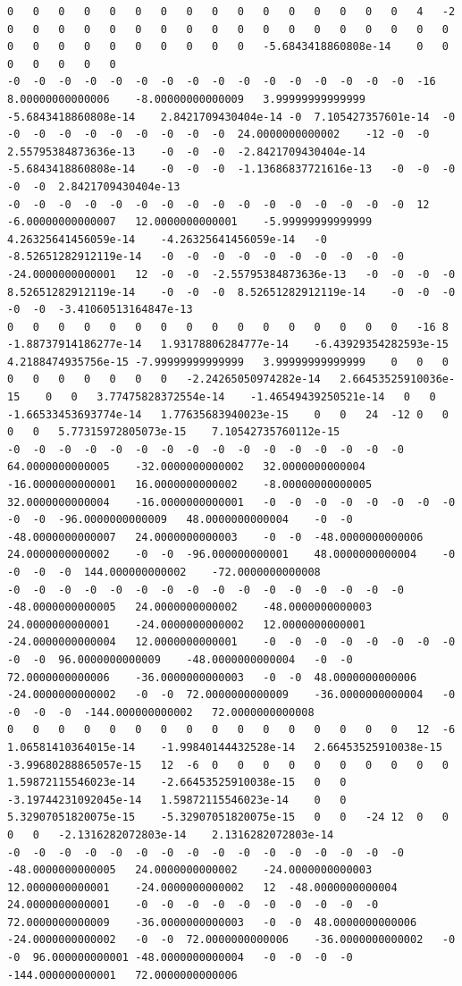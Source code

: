 \documentclass[12pt]{report} %
\begin{document}
\begin{landscape}
\begin{lstlisting}[numbers=none, basicstyle=\ttfamily\tiny, captionpos=b, caption={Matriz de coeficientes $W = G^{-1}$ ($54\times54$) calculada con MATLAB, sin redondear.}, label=cod:W-matlab]
0	0	0	0	0	0	0	0	0	0	0	0	0	0	0	0	4	-2	0	0	0	0	0	0	0	0	0	0	0	0	0	0	0	0	0	0	0	0	0	0	0	0	0	0	0	0	-5.6843418860808e-14	0	0	0	0	0	0	0
-0	-0	-0	-0	-0	-0	-0	-0	-0	-0	-0	-0	-0	-0	-0	-0	-16	8.00000000000006	-8.00000000000009	3.99999999999999	-5.6843418860808e-14	2.8421709430404e-14	-0	7.105427357601e-14	-0	-0	-0	-0	-0	-0	-0	-0	-0	-0	24.0000000000002	-12	-0	-0	2.55795384873636e-13	-0	-0	-0	-2.8421709430404e-14	-5.6843418860808e-14	-0	-0	-0	-1.13686837721616e-13	-0	-0	-0	-0	-0	2.8421709430404e-13
-0	-0	-0	-0	-0	-0	-0	-0	-0	-0	-0	-0	-0	-0	-0	-0	12	-6.00000000000007	12.0000000000001	-5.99999999999999	4.26325641456059e-14	-4.26325641456059e-14	-0	-8.52651282912119e-14	-0	-0	-0	-0	-0	-0	-0	-0	-0	-0	-24.0000000000001	12	-0	-0	-2.55795384873636e-13	-0	-0	-0	-0	8.52651282912119e-14	-0	-0	-0	8.52651282912119e-14	-0	-0	-0	-0	-0	-3.41060513164847e-13
0	0	0	0	0	0	0	0	0	0	0	0	0	0	0	0	-16	8	-1.88737914186277e-14	1.93178806284777e-14	-6.43929354282593e-15	4.2188474935756e-15	-7.99999999999999	3.99999999999999	0	0	0	0	0	0	0	0	0	0	-2.24265050974282e-14	2.66453525910036e-15	0	0	3.77475828372554e-14	-1.46549439250521e-14	0	0	-1.66533453693774e-14	1.77635683940023e-15	0	0	24	-12	0	0	0	0	5.77315972805073e-15	7.10542735760112e-15
-0	-0	-0	-0	-0	-0	-0	-0	-0	-0	-0	-0	-0	-0	-0	-0	64.0000000000005	-32.0000000000002	32.0000000000004	-16.0000000000001	16.0000000000002	-8.00000000000005	32.0000000000004	-16.0000000000001	-0	-0	-0	-0	-0	-0	-0	-0	-0	-0	-96.0000000000009	48.0000000000004	-0	-0	-48.0000000000007	24.0000000000003	-0	-0	-48.0000000000006	24.0000000000002	-0	-0	-96.000000000001	48.0000000000004	-0	-0	-0	-0	144.000000000002	-72.0000000000008
-0	-0	-0	-0	-0	-0	-0	-0	-0	-0	-0	-0	-0	-0	-0	-0	-48.0000000000005	24.0000000000002	-48.0000000000003	24.0000000000001	-24.0000000000002	12.0000000000001	-24.0000000000004	12.0000000000001	-0	-0	-0	-0	-0	-0	-0	-0	-0	-0	96.0000000000009	-48.0000000000004	-0	-0	72.0000000000006	-36.0000000000003	-0	-0	48.0000000000006	-24.0000000000002	-0	-0	72.0000000000009	-36.0000000000004	-0	-0	-0	-0	-144.000000000002	72.0000000000008
0	0	0	0	0	0	0	0	0	0	0	0	0	0	0	0	12	-6	1.06581410364015e-14	-1.99840144432528e-14	2.66453525910038e-15	-3.99680288865057e-15	12	-6	0	0	0	0	0	0	0	0	0	0	1.59872115546023e-14	-2.66453525910038e-15	0	0	-3.19744231092045e-14	1.59872115546023e-14	0	0	5.32907051820075e-15	-5.32907051820075e-15	0	0	-24	12	0	0	0	0	-2.1316282072803e-14	2.1316282072803e-14
-0	-0	-0	-0	-0	-0	-0	-0	-0	-0	-0	-0	-0	-0	-0	-0	-48.0000000000005	24.0000000000002	-24.0000000000003	12.0000000000001	-24.0000000000002	12	-48.0000000000004	24.0000000000001	-0	-0	-0	-0	-0	-0	-0	-0	-0	-0	72.0000000000009	-36.0000000000003	-0	-0	48.0000000000006	-24.0000000000002	-0	-0	72.0000000000006	-36.0000000000002	-0	-0	96.000000000001	-48.0000000000004	-0	-0	-0	-0	-144.000000000001	72.0000000000006

\end{lstlisting}
\end{landscape}
\end{document}
